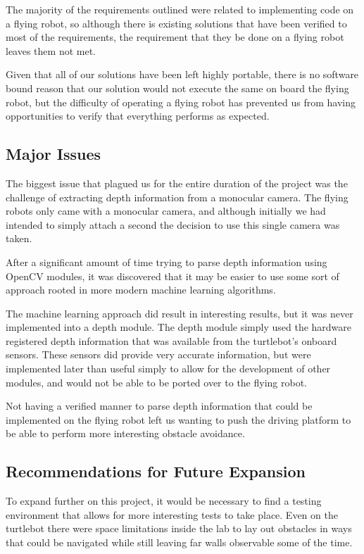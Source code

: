 \documentclass{article}[12]
\begin{document}
The majority of the requirements outlined were related to implementing code on a flying robot, so although there is existing solutions that have been verified to most of the requirements, the requirement that they be done on a flying robot leaves them not met.

Given that all of our solutions have been left highly portable, there is no software bound reason that our solution would not execute the same on board the flying robot, but the difficulty of operating a flying robot has prevented us from having opportunities to verify that everything performs as expected.

\subsection{Major Issues}

The biggest issue that plagued us for the entire duration of the project was the challenge of extracting depth information from a monocular camera. The flying robots only came with a monocular camera, and although initially we had intended to simply attach a second the decision to use this single camera was taken.

After a significant amount of time trying to parse depth information using OpenCV modules, it was discovered that it may be easier to use some sort of approach rooted in more modern machine learning algorithms.

The machine learning approach did result in interesting results, but it was never implemented into a depth module. The depth module simply used the hardware registered depth information that was available from the turtlebot's onboard sensors. These sensors did provide very accurate information, but were implemented later than useful simply to allow for the development of other modules, and would not be able to be ported over to the flying robot. 

Not having a verified manner to parse depth information that could be implemented on the flying robot left us wanting to push the driving platform to be able to perform more interesting obstacle avoidance.

\subsection{Recommendations for Future Expansion}

To expand further on this project, it would be necessary to find a testing environment that allows for more interesting tests to take place. Even on the turtlebot there were space limitations inside the lab to lay out obstacles in ways that could be navigated while still leaving far walls observable some of the time. 
\end{document}
